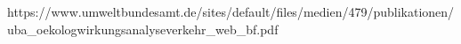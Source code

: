 https://www.umweltbundesamt.de/sites/default/files/medien/479/publikationen/uba_oekologwirkungsanalyseverkehr_web_bf.pdf
